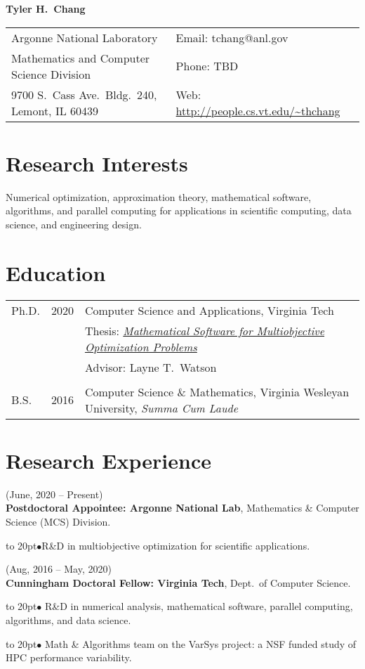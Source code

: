 \documentclass[11pt]{article}
\def\bullitem{\par\hangindent=15pt \hangafter=1
\noindent\hbox to 20pt{\hfil$\bullet$\hfil}\ignorespaces}
\begin{document}
{\Large \textbf{Tyler H.\ Chang}}

\begin{tabular}{ll}
   Argonne National Laboratory & Email: tchang@anl.gov\\
   Mathematics and Computer Science Division & Phone: TBD\\
   9700 S.\ Cass Ave.\ Bldg.\ 240, Lemont, IL 60439
      & Web: \url{http://people.cs.vt.edu/~thchang} \\
\end{tabular}

\section*{Research Interests}

Numerical optimization, approximation theory, mathematical software,
algorithms, and parallel computing for applications in scientific computing,
data science, and engineering design.

\section*{Education}

\begin{tabular}{lcl}
Ph.D. & 2020 & Computer Science and Applications, Virginia Tech\\
& & Thesis: 
\href{http://hdl.handle.net/10919/98915}
{\it Mathematical Software for Multiobjective Optimization Problems}\\
& & Advisor: Layne T.\ Watson\\
& \\
B.S. & 2016 & Computer Science \& Mathematics,
Virginia Wesleyan University, \textit{Summa Cum Laude}\\
\end{tabular}

\section*{Research Experience}

(June, 2020 -- Present)\\
\textbf{Postdoctoral Appointee: Argonne National Lab},
Mathematics \& Computer Science (MCS) Division.
\bullitem R\&D in multiobjective optimization for scientific applications.

\medskip

(Aug, 2016 -- May, 2020)\\
\textbf{Cunningham Doctoral Fellow: Virginia Tech}, Dept.\ of Computer Science.
\bullitem
R\&D in numerical analysis, mathematical software, parallel computing,
algorithms, and data science.
\bullitem
Math \& Algorithms team on the VarSys project: a NSF funded study of
HPC performance variability.
\end{document}

